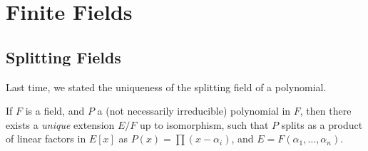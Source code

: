 

\section{Finite Fields}

\subsection{Splitting Fields}

Last time, we stated the uniqueness of the splitting field of a polynomial. 

\begin{proposition}
    If $F$ is a field, and $P$ a (not necessarily irreducible) polynomial in $F$, then there exists a \emph{unique} extension $E/F$ up to isomorphism, such that $P$ splits as a product of linear factors in $E[x]$ as $P(x) = \prod (x - \alpha_i)$, and $E = F(\alpha_1, \ldots, \alpha_n)$. 
\end{proposition}

